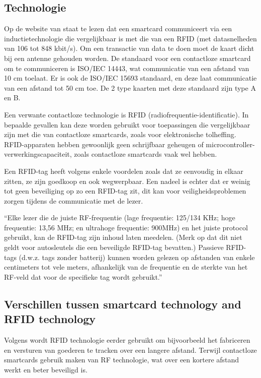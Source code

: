 \subsection{Technologie}
Op de website van \textcite{STASmartCard} staat te lezen dat een smartcard communiceert via een inductietechnologie die vergelijkbaar is met die van een RFID (met datasnelheden van 106 tot 848 kbit/s). Om een transactie van data te doen moet de kaart dicht bij een antenne gehouden worden. De standaard voor een contactloze smartcard om te communiceren is ISO/IEC 14443, wat communicatie van een afstand van 10 cm toelaat. Er is ook de ISO/IEC 15693 standaard, en deze laat communicatie van een afstand tot 50 cm toe. De 2 type kaarten met deze standaard zijn type A en B. 

Een verwante contactloze technologie is RFID (radiofrequentie-identificatie). In bepaalde gevallen kan deze worden gebruikt voor toepassingen die vergelijkbaar zijn met die van contactloze smartcards, zoals voor elektronische tolheffing. RFID-apparaten hebben gewoonlijk geen schrijfbaar geheugen of \newline microcontroller-verwerkingscapaciteit, zoals contactloze smartcards vaak wel hebben.

Een RFID-tag heeft volgens \textcite{STASmartCard} enkele voordelen zoals dat ze eenvoudig in elkaar zitten, ze zijn goedkoop en ook wegwerpbaar. Een nadeel is echter dat er weinig tot geen beveiliging op zo een RFID-tag zit, dit kan voor veiligheidsproblemen zorgen tijdens de communicatie met de lezer.

``Elke lezer die de juiste RF-frequentie (lage frequentie: 125/134 KHz; hoge frequentie: 13,56 MHz; en ultrahoge frequentie: 900MHz) en het juiste protocol gebruikt, kan de RFID-tag zijn inhoud laten meedelen. (Merk op dat dit niet geldt voor autosleutels die een beveiligde RFID-tag bevatten.) Passieve RFID-tags (d.w.z. tags zonder batterij) kunnen worden gelezen op afstanden van enkele centimeters tot vele meters, afhankelijk van de frequentie en de sterkte van het RF-veld dat voor de specifieke tag wordt gebruikt.''\autocite{STASmartCard}

\subsection{Verschillen tussen smartcard technology and RFID technology}
Volgens \textcite{STASmartCard} wordt RFID technologie eerder gebruikt om bijvoorbeeld het fabriceren en versturen van goederen te tracken over een langere afstand. Terwijl contactloze smartcards gebruik maken van RF technologie, wat over een kortere afstand werkt en beter beveiligd is.

